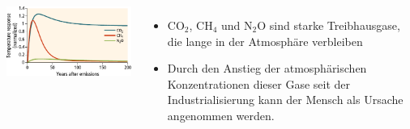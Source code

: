 \begin{frame}
\begin{columns}
	\end{columns}
	\begin{columns}
			\includegraphics[width=0.9\linewidth]{bilder/ghg-forcings-over-time.pdf}
			\begin{itemize}
				\item CO$_2$, CH$_4$ und N$_2$O sind starke Treibhausgase, die lange in der Atmosphäre verbleiben
				\item Durch den Anstieg der atmosphärischen Konzentrationen dieser Gase seit der Industrialisierung kann der Mensch als Ursache angenommen werden.
			\end{itemize}
	\end{columns}
\end{frame}
